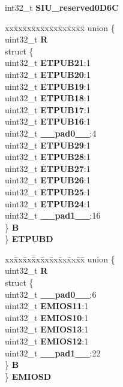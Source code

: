 \begin{DoxyCompactItemize}
\begin{tabbing}
\end{tabbing}\item 
\mbox{\label{structSIU__tag_a56707314fa9f86c4683e4ed7089a3307}} 
int32\+\_\+t {\bfseries S\+I\+U\+\_\+reserved0\+D6C}
\item 
\mbox{\label{structSIU__tag_a64dc0fbbdadbf4b44116cb5e86e8bb7f}} 
\begin{tabbing}
xx\=xx\=xx\=xx\=xx\=xx\=xx\=xx\=xx\=\kill
union \{\\
\>uint32\_t {\bfseries R}\\
\>struct \{\\
\>\>uint32\_t {\bfseries ETPUB21}:1\\
\>\>uint32\_t {\bfseries ETPUB20}:1\\
\>\>uint32\_t {\bfseries ETPUB19}:1\\
\>\>uint32\_t {\bfseries ETPUB18}:1\\
\>\>uint32\_t {\bfseries ETPUB17}:1\\
\>\>uint32\_t {\bfseries ETPUB16}:1\\
\>\>uint32\_t {\bfseries \_\_pad0\_\_}:4\\
\>\>uint32\_t {\bfseries ETPUB29}:1\\
\>\>uint32\_t {\bfseries ETPUB28}:1\\
\>\>uint32\_t {\bfseries ETPUB27}:1\\
\>\>uint32\_t {\bfseries ETPUB26}:1\\
\>\>uint32\_t {\bfseries ETPUB25}:1\\
\>\>uint32\_t {\bfseries ETPUB24}:1\\
\>\>uint32\_t {\bfseries \_\_pad1\_\_}:16\\
\>\} {\bfseries B}\\
\} {\bfseries ETPUBD}\\

\end{tabbing}\item 
\mbox{\label{structSIU__tag_ab0603ad6c5a66bde562c2707b40bb46e}} 
\begin{tabbing}
xx\=xx\=xx\=xx\=xx\=xx\=xx\=xx\=xx\=\kill
union \{\\
\>uint32\_t {\bfseries R}\\
\>struct \{\\
\>\>uint32\_t {\bfseries \_\_pad0\_\_}:6\\
\>\>uint32\_t {\bfseries EMIOS11}:1\\
\>\>uint32\_t {\bfseries EMIOS10}:1\\
\>\>uint32\_t {\bfseries EMIOS13}:1\\
\>\>uint32\_t {\bfseries EMIOS12}:1\\
\>\>uint32\_t {\bfseries \_\_pad1\_\_}:22\\
\>\} {\bfseries B}\\
\} {\bfseries EMIOSD}\\


\end{tabbing}
\end{DoxyCompactItemize}
